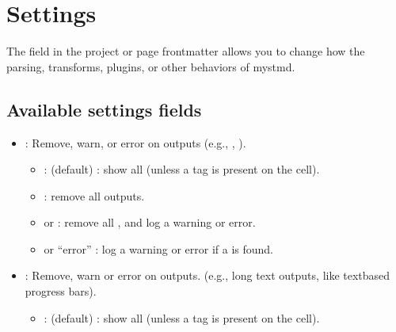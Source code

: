 \documentclass[letterpaper,12pt,english]{sphinxmanual}
\begin{document}
\chapter{Settings}
\label{\detokenize{notebooks/02-myst.integration:settings}}
\sphinxAtStartPar
The  field in the project or page frontmatter allows you to change how the parsing, transforms, plugins, or other behaviors of mystmd.


\section{Available settings fields}
\label{\detokenize{notebooks/02-myst.integration:available-settings-fields}}\begin{itemize}
\item {} 
\sphinxAtStartPar
{} : Remove, warn, or error on  outputs (e.g., , ).
\begin{itemize}
\item {} 
\sphinxAtStartPar
{} : (default) : show all  (unless a  tag is present on  the cell).

\item {} 
\sphinxAtStartPar
{} : remove all  outputs.

\item {} 
\sphinxAtStartPar
{} or  : remove all , and log a warning or error.

\item {} 
\sphinxAtStartPar
{} or “error” : log a warning or error if a  is found.

\end{itemize}

\item {} 
\sphinxAtStartPar
{} : Remove, warn or error on  outputs. (e.g., long text outputs, like text\sphinxhyphen{}based progress bars).
\begin{itemize}
\item {} 
\sphinxAtStartPar
{} : (default) : show all  (unless a  tag is present on the cell).


\end{itemize}
\end{itemize}
\end{document}
